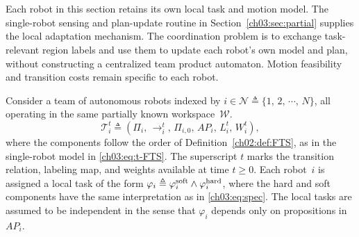 \section{}
\label{ch03:sec:task_relaxation_adaptation}
\label{ch03:sec:multi-partial}

\begin{revision}
Each robot in this section retains its own local task and motion model.
The single-robot sensing and plan-update routine in
Section~\ref{ch03:sec:partial} supplies the local adaptation mechanism.
The coordination problem is to exchange task-relevant region labels and
use them to update each robot's own model and plan, without constructing
a centralized team product automaton. Motion feasibility and transition
costs remain specific to each robot.
\end{revision}


Consider a team of autonomous robots indexed by
$i \in \mathcal{N} \triangleq \{1,\, 2,\, \cdots,\, N\}$, all operating in the
same partially known workspace~$\mathcal{W}$.
{\color{blue}
\begin{equation}
\mathcal{T}_i^t \triangleq
(\Pi_i,\, \longrightarrow_i^t,\, \Pi_{i,0},\, AP_i,\, L_i^t,\, W_i^t),
\label{ch03:eq:Tk}
\end{equation}
where the components follow the order of Definition~\ref{ch02:def:FTS},
as in the single-robot model in \eqref{ch03:eq:t-FTS}. The superscript $t$
marks the transition relation, labeling map, and weights available at time
$t \geq 0$.} Each
robot~$i$ is assigned a local task of the form
$\varphi_i \triangleq
\varphi_i^{\textup{soft}} \wedge \varphi_i^{\textup{hard}}$,
where the hard and soft components have the same interpretation as in
\eqref{ch03:eq:spec}. The local tasks are assumed to be independent in the
sense that $\varphi_i$ depends only on propositions in~$AP_i$.

